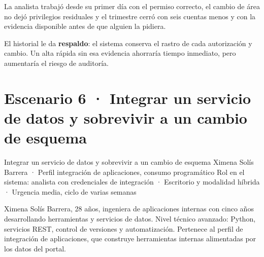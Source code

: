 
La analista trabajó desde su primer día con el permiso correcto, el cambio de área no dejó
privilegios residuales y el trimestre cerró con seis cuentas menos y con la evidencia
disponible antes de que alguien la pidiera.

El historial le da \textbf{respaldo}: el sistema conserva el rastro de cada autorización y
cambio. Un alta rápida sin esa evidencia ahorraría tiempo inmediato, pero aumentaría el riesgo
de auditoría.


\begin{uxlist}
\end{uxlist}

\clearpage
\section{Escenario 6 · Integrar un servicio de datos y sobrevivir a un cambio de esquema}

  {Integrar un servicio de datos y sobrevivir a un cambio de esquema}
  {Ximena Solís Barrera · Perfil integración de aplicaciones, consumo programático}
  {Rol en el sistema: analista con credenciales de integración · Escritorio y modalidad híbrida · Urgencia media, ciclo de varias semanas}


Ximena Solís Barrera, 28 años, ingeniera de aplicaciones internas con cinco años desarrollando
herramientas y servicios de datos. Nivel técnico avanzado: Python, servicios REST, control de
versiones y automatización. Pertenece al perfil de integración de aplicaciones, que construye
herramientas internas alimentadas por los datos del portal.

